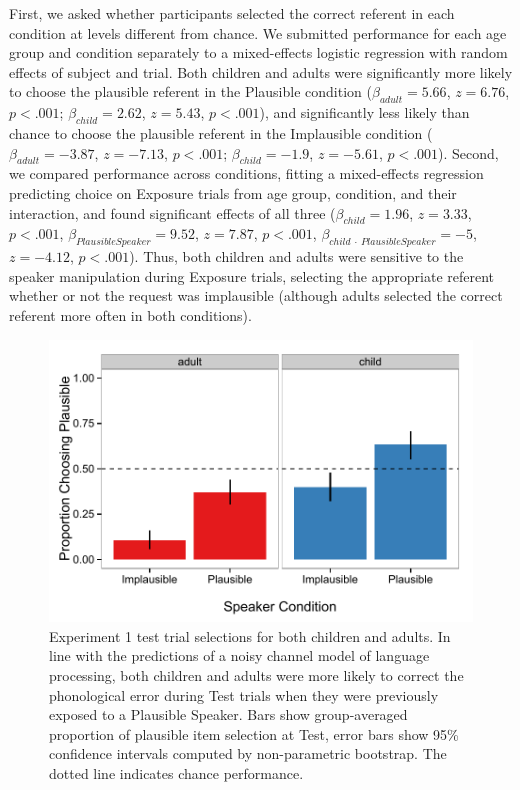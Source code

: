 \documentclass[man,floatsintext]{apa6}
\begin{document}
First, we asked whether participants selected the correct referent in each condition at levels different from chance. We submitted performance for each age group and condition separately to a mixed-effects logistic regression with random effects of subject and trial. Both children and adults were significantly more likely to choose the plausible referent in the Plausible condition ($\beta_{adult} = 5.66$, $z = 6.76$, $p <.001$; $\beta_{child} = 2.62$, $z = 5.43$, $p <.001$), and significantly less likely than chance to choose the plausible referent in the Implausible condition ($\beta_{adult} = -3.87$, $z = -7.13$, $p <.001$; $\beta_{child} = -1.9$, $z = -5.61$, $p <.001$). Second, we compared performance across conditions, fitting a mixed-effects regression predicting choice on Exposure trials from age group, condition, and their interaction, and found significant effects of all three ($\beta_{child} = 1.96$,  $z = 3.33$, $p <.001$, $\beta_{Plausible Speaker} = 9.52$,  $z = 7.87$, $p <.001$,  $\beta_{child\: \cdot \: Plausible Speaker} = -5$,  $z = -4.12$, $p <.001$). Thus, both children and adults were sensitive to the speaker manipulation during Exposure trials, selecting the appropriate referent whether or not the request was implausible (although adults selected the correct referent more often in both conditions).

\begin{figure}[t]
\centering
     \includegraphics[width=5in]{figures/exp1_results.pdf}
    \caption{Experiment 1 test trial selections for both children and adults. In line with the predictions of a noisy channel model of language processing, both children and adults were more likely to correct the phonological error during Test trials when they were previously exposed to a Plausible Speaker. Bars show group-averaged proportion of plausible item selection at Test, error bars show 95\% confidence intervals computed by non-parametric bootstrap. The dotted line indicates chance performance.}%
   \label{fig:exp1_results}
\end{figure}
\end{document}
